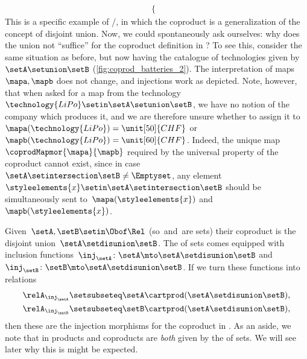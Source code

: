 \begin{example}
\begin{equation}
\begin{aligned}
\begin{cases}
            \end{cases}
        \end{aligned}
    \end{equation}
    This is a specific example of \Set/\FinSet, in which the coproduct is a generalization of the concept of disjoint union.
    Now, we could spontaneously ask ourselves: why does the union not ``suffice'' for the coproduct definition in \Set?
    To see this, consider the same situation as before, but now having the catalogue of technologies given by~$\setA\setunion \setB$ (\cref{fig:coprod_batteries_2}).
    The interpretation of maps~$\mapa,\mapb$ does not change, and injections work as depicted.
    Note, however, that when asked for a map from the technology~$\technology{LiPo}\setin \setA\setunion \setB$, we have no notion of the company which produces it, and we are therefore unsure whether to assign it to~$\mapa(\technology{LiPo})=\unit[50]{CHF}$ or~$\mapb(\technology{LiPo})=\unit[60]{CHF}$.
    Indeed, the unique map~$\coprodMapmor{\mapa}{\mapb}$ required by the universal property of the coproduct cannot exist, since in case~$\setA\setintersection \setB\neq \Emptyset$, any element~$\styleelements{x}\setin \setA\setintersection \setB$ should be simultaneously sent to~$\mapa(\styleelements{x})$ and~$\mapb(\styleelements{x})$.
\end{example}


\begin{example}
    Given~$\setA,\setB\setin \Obof\Rel$ (so~\setA and~\setB are sets) their coproduct is the disjoint union~$\setA \setdisunion \setB$.
    The  of sets comes equipped with inclusion functions~$\inj_\setA\colon \setA\mto \setA \setdisunion\setB$ and~$\inj_\setB\colon \setB\mto \setA \setdisunion\setB$.
    If we turn these functions into relations
    \begin{align}\label{eq:coprod-rel-inclusions}
        {\relA}_{\inj_\setA} & \setsubseteq \setA\cartprod (\setA \setdisunion\setB), \\
        {\relA}_{\inj_\setB} & \setsubseteq \setB\cartprod (\setA \setdisunion\setB),
    \end{align}
    then these are the injection morphisms for the coproduct in \Rel.
    As an aside, we note that in \Rel products and coproducts are \emph{both} given by the  of sets.
    We will see later why this is might be expected.
\end{example}


